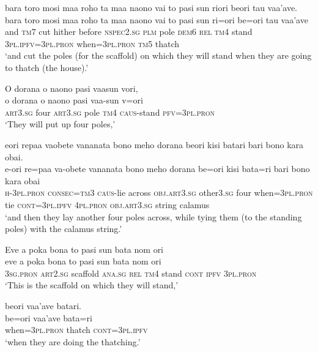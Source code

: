 \ea\label{ex:text2-33}
bara toro mosi maa roho ta maa naono vai to pasi sun riori beori tau vaa'ave.\\
\gll bara	toro	mosi	maa	roho	ta	maa	naono	vai	to	pasi	sun	ri=ori	be=ori	tau	vaa'ave\\
     and	\textsc{tm}7	cut	hither	before	\textsc{nspec}2.\textsc{sg}	\textsc{plm}	pole	\textsc{dem}6	\textsc{rel}	\textsc{tm}4	stand	3\textsc{pl}.\textsc{ipfv}=3\textsc{pl}.\textsc{pron}	when=3\textsc{pl}.\textsc{pron}	\textsc{tm}5	thatch\\
\glt `and cut the poles (for the scaffold) on which they will stand when they are going to thatch (the house).'
\z

\ea\label{ex:text2-34}
O dorana o naono pasi vaasun vori,\\
\gll o	dorana	o	naono	pasi	vaa-sun	v=ori\\
     \textsc{art}3.\textsc{sg}	four	\textsc{art}3.\textsc{sg}	pole	\textsc{tm}4	\textsc{caus}-stand	\textsc{pfv}=3\textsc{pl}.\textsc{pron}\\
\glt `They will put up four poles,'
\z

\newpage
\ea\label{ex:text2-35}
eori repaa vaobete vananata bono meho dorana beori kisi batari bari bono kara obai.\\
\gll e-ori	re=paa	va-obete	vananata	bono	meho	dorana	be=ori	kisi	bata=ri	bari	bono	kara	obai\\
     \textsc{h}-3\textsc{pl}.\textsc{pron}	\textsc{consec}=\textsc{tm}3	\textsc{caus}-lie	across	\textsc{obj}.\textsc{art}3.\textsc{sg}	other3.\textsc{sg}	four	when=3\textsc{pl}.\textsc{pron}	tie	\textsc{cont}=3\textsc{pl}.\textsc{ipfv}	4\textsc{pl}.\textsc{pron}	\textsc{obj}.\textsc{art}3.\textsc{sg}	string	calamus\\
\glt `and then they lay another four poles across, while tying them (to the standing poles) with the calamus string.'
\z

\ea\label{ex:text2-36}
Eve a poka bona to pasi sun bata nom ori\\
\gll eve	a	poka	bona	to	pasi	sun	bata	nom	ori\\
     3\textsc{sg}.\textsc{pron}	\textsc{art}2.\textsc{sg}	scaffold	\textsc{ana}.\textsc{sg}	\textsc{rel}	\textsc{tm}4	stand	\textsc{cont}	\textsc{ipfv}	3\textsc{pl}.\textsc{pron}\\
\glt `This is the scaffold on which they will stand,'
\z

\ea\label{ex:text2-37}
beori vaa'ave batari.\\
\gll be=ori	vaa'ave	bata=ri\\
     when=3\textsc{pl}.\textsc{pron}	thatch	\textsc{cont}=3\textsc{pl}.\textsc{ipfv}\\
\glt `when they are doing the thatching.'
\z

